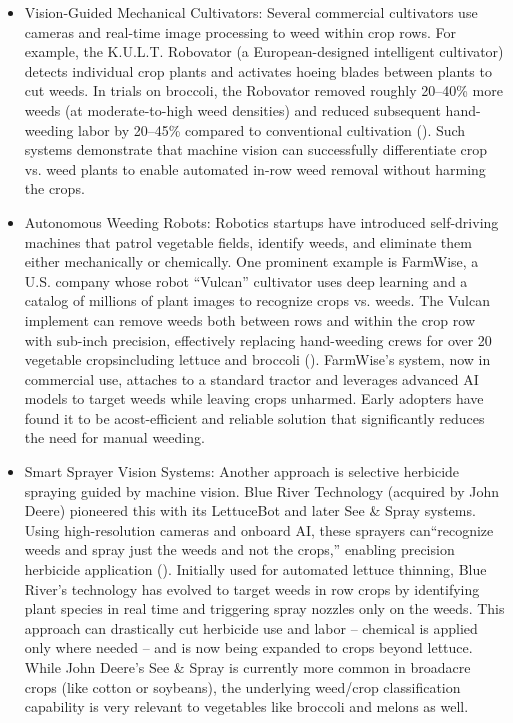 \documentclass[letterpaper]{report}
\begin{document}
\begin{itemize}

	\item{Vision-Guided Mechanical Cultivators: Several commercial cultivators use cameras and real-time image processing to weed within crop rows. For example, the K.U.L.T. Robovator (a European-designed intelligent cultivator) detects individual crop plants and activates hoeing blades between plants to cut weeds. In trials on broccoli, the Robovator removed roughly 20–40\% more weeds (at moderate-to-high weed densities) and reduced subsequent hand-weeding labor by 20–45\% compared to conventional cultivation (\cite{Lati2016-lb}). Such systems demonstrate that machine vision can successfully differentiate crop vs. weed plants to enable automated in-row weed removal without harming the crops.}

	\item{Autonomous Weeding Robots: Robotics startups have introduced self-driving machines that patrol vegetable fields, identify weeds, and eliminate them either mechanically or chemically. One prominent example is FarmWise, a U.S. company whose robot “Vulcan” cultivator uses deep learning and a catalog of millions of plant images to recognize crops vs. weeds. The Vulcan implement can remove weeds both between rows and within the crop row with sub-inch precision, effectively replacing hand-weeding crews for over 20 vegetable cropsincluding lettuce and broccoli (\cite{Farmwise2023-pi}). FarmWise’s system, now in commercial use, attaches to a standard tractor and leverages advanced AI models to target weeds while leaving crops unharmed. Early adopters have found it to be acost-efficient and reliable solution that significantly reduces the need for manual weeding.}

	\item{Smart Sprayer Vision Systems: Another approach is selective herbicide spraying guided by machine vision. Blue River Technology (acquired by John Deere) pioneered this with its LettuceBot and later See \& Spray systems. Using high-resolution cameras and onboard AI, these sprayers can“recognize weeds and spray just the weeds and not the crops,” enabling precision herbicide application (\cite{Bedord2016-fa}). Initially used for automated lettuce thinning, Blue River’s technology has evolved to target weeds in row crops by identifying plant species in real time and triggering spray nozzles only on the weeds. This approach can drastically cut herbicide use and labor – chemical is applied only where needed – and is now being expanded to crops beyond lettuce. While John Deere’s See \& Spray is currently more common in broadacre crops (like cotton or soybeans), the underlying weed/crop classification capability is very relevant to vegetables like broccoli and melons as well.}


\end{itemize}
\end{document}
